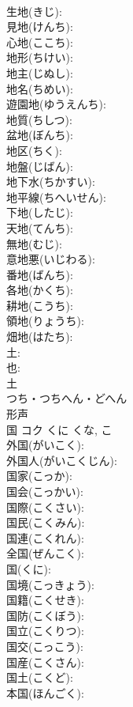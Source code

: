\documentclass[8pt]{extreport}
\begin{document}
\begin{CJK}{UTF8}{min}
\\	生地(きじ): 
\\	見地(けんち): 
\\	心地(ここち): 
\\	地形(ちけい): 
\\	地主(じぬし): 
\\	地名(ちめい): 
\\	遊園地(ゆうえんち): 
\\	地質(ちしつ): 
\\	盆地(ぼんち): 
\\	地区(ちく): 
\\	地盤(じばん): 
\\	地下水(ちかすい): 
\\	地平線(ちへいせん): 
\\	下地(したじ): 
\\	天地(てんち): 
\\	無地(むじ): 
\\	意地悪(いじわる): 
\\	番地(ばんち): 
\\	各地(かくち): 
\\	耕地(こうち): 
\\	領地(りょうち): 
\\	畑地(はたち): 
\\	土: 
\\	也: 
\\	土	
\\	つち・つちへん・どへん	
\\	形声 
\\	国	コク	くに	くな, こ	
\\	外国(がいこく): 
\\	外国人(がいこくじん): 
\\	国家(こっか): 
\\	国会(こっかい): 
\\	国際(こくさい): 
\\	国民(こくみん): 
\\	国連(こくれん): 
\\	全国(ぜんこく): 
\\	国(くに): 
\\	国境(こっきょう): 
\\	国籍(こくせき): 
\\	国防(こくぼう): 
\\	国立(こくりつ): 
\\	国交(こっこう): 
\\	国産(こくさん): 
\\	国土(こくど): 
\\	本国(ほんごく): 

\end{CJK}
\end{document}
